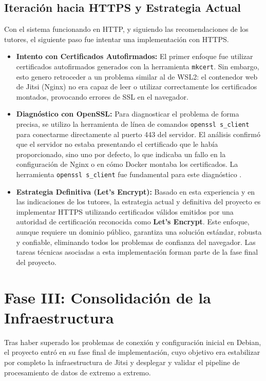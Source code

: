 \subsection{Iteración hacia HTTPS y Estrategia Actual}
Con el sistema funcionando en HTTP, y siguiendo las recomendaciones de los tutores, el siguiente paso fue intentar una implementación con HTTPS.
\begin{itemize}
    \item \textbf{Intento con Certificados Autofirmados:} El primer enfoque fue utilizar certificados autofirmados generados con la herramienta \texttt{mkcert}. Sin embargo, esto genero retroceder a un problema similar al de WSL2: el contenedor web de Jitsi (Nginx) no era capaz de leer o utilizar correctamente los certificados montados, provocando errores de SSL en el navegador.
    
    \item \textbf{Diagnóstico con OpenSSL:} Para diagnosticar el problema de forma precisa, se utilizo la herramienta de línea de comandos \texttt{openssl s\_client} para conectarme directamente al puerto 443 del servidor. El análisis confirmó que el servidor no estaba presentando el certificado que le había proporcionado, sino uno por defecto, lo que indicaba un fallo en la configuración de Nginx o en cómo Docker montaba los certificados. La herramienta \texttt{openssl s\_client} fue fundamental para este diagnóstico \cite{openssl_docs}.
    
    \item \textbf{Estrategia Definitiva (Let's Encrypt):} Basado en esta experiencia y en las indicaciones de los tutores, la estrategia actual y definitiva del proyecto es implementar HTTPS utilizando certificados válidos emitidos por una autoridad de certificación reconocida como \textbf{Let's Encrypt}. Este enfoque, aunque requiere un dominio público, garantiza una solución estándar, robusta y confiable, eliminando todos los problemas de confianza del navegador. Las tareas técnicas asociadas a esta implementación forman parte de la fase final del proyecto.
\end{itemize}

\section{Fase III: Consolidación de la Infraestructura}
\label{sec:desarrollo_acto_final}

Tras haber superado los problemas de conexión y configuración inicial en Debian, el proyecto entró en su fase final de implementación, cuyo objetivo era estabilizar por completo la infraestructura de Jitsi y desplegar y validar el pipeline de procesamiento de datos de extremo a extremo.

